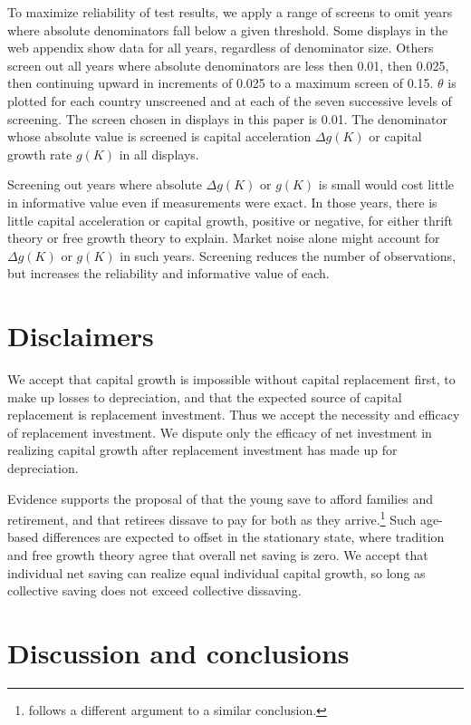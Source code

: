 \documentclass[a4padisinvitingper,fleqn]{latex_styles/cas-sc}
\begin{document}
To maximize reliability of test results, we apply a range of screens to
omit years where absolute denominators fall below a given
threshold. Some displays in the web appendix show data for all years, regardless of denominator size.
Others screen out all years where
absolute denominators are less then 0.01, then 0.025, then continuing upward in
increments of 0.025 to a maximum screen of 0.15. \(\theta\)
is plotted for each country unscreened and at each of the
seven successive levels of screening.
The screen chosen in displays in this paper is 0.01.
The denominator whose absolute value is screened is capital acceleration
$\Delta g(K)$ or capital growth rate \(g(K)\) in all displays. 

Screening out years where absolute \(\Delta g(K)\) or $g(K)$ is small would cost
little in informative value even if measurements were exact. In those
years, there is little capital acceleration or capital growth, positive or negative, for
either thrift theory or free growth theory to explain. Market noise
alone might account for \(\Delta g(K)\) or $g(K)$ in such years. Screening reduces
the number of observations, but increases the reliability and
informative value of each.

\hypertarget{disclaimers}{%
\section{Disclaimers}\label{disclaimers}}

We accept that capital growth is impossible without capital replacement first, to make up losses to depreciation, and that the expected source of capital replacement is replacement investment. Thus we accept the necessity and efficacy of replacement investment. We dispute only the efficacy of net investment in realizing capital growth after replacement investment has made up for depreciation.

Evidence supports the proposal of \cite{modigliani1954utility}  that the young save to afford families and retirement, and that retirees dissave to pay for both as they arrive.\footnote{\cite{friedman1957permanent} follows a different argument to a similar conclusion.} Such age-based differences are expected to offset in the stationary state, where tradition and free growth theory agree that overall net saving is zero. We accept that individual net saving can realize equal individual capital growth, so long as collective saving does not exceed collective dissaving.

\hypertarget{discussion-and-conclusions}{%
\section{Discussion and conclusions}\label{discussion-and-conclusions}}
\end{document}
